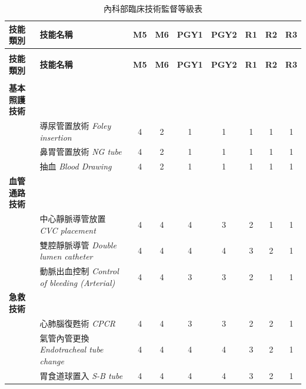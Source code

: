 \documentclass[a4paper,12pt]{article}
\begin{document}
\begin{longtable}{>{\raggedright}p{3cm}>{\raggedright\arraybackslash}p{4.5cm}ccccccc}
\caption{內科部臨床技術監督等級表} \label{tab:internal-medicine-skills} \\
\toprule
\textbf{技能類別} & \textbf{技能名稱} & \textbf{M5} & \textbf{M6} & \textbf{PGY1} & \textbf{PGY2} & \textbf{R1} & \textbf{R2} & \textbf{R3} \\
\midrule
\endfirsthead

\multicolumn{9}{c}{\textit{續前頁}} \\
\toprule
\textbf{技能類別} & \textbf{技能名稱} & \textbf{M5} & \textbf{M6} & \textbf{PGY1} & \textbf{PGY2} & \textbf{R1} & \textbf{R2} & \textbf{R3} \\
\midrule
\endhead

\midrule
\multicolumn{9}{r}{\textit{續下頁}} \\
\endfoot

\bottomrule
\endlastfoot

\textbf{基本照護技術} & & & & & & & & \\
\midrule
& 導尿管置放術 \newline \textit{Foley insertion} & 4 & 2 & 1 & 1 & 1 & 1 & 1 \\
& 鼻胃管置放術 \newline \textit{NG tube} & 4 & 2 & 1 & 1 & 1 & 1 & 1 \\
& 抽血 \newline \textit{Blood Drawing} & 4 & 2 & 1 & 1 & 1 & 1 & 1 \\
\midrule

\textbf{血管通路技術} & & & & & & & & \\
\midrule
& 中心靜脈導管放置 \newline \textit{CVC placement} & 4 & 4 & 4 & 3 & 2 & 1 & 1 \\
& 雙腔靜脈導管 \newline \textit{Double lumen catheter} & 4 & 4 & 4 & 4 & 3 & 2 & 1 \\
& 動脈出血控制 \newline \textit{Control of bleeding (Arterial)} & 4 & 4 & 3 & 3 & 2 & 1 & 1 \\
\midrule

\textbf{急救技術} & & & & & & & & \\
\midrule
& 心肺腦復甦術 \newline \textit{CPCR} & 4 & 4 & 3 & 3 & 2 & 2 & 1 \\
& 氣管內管更換 \newline \textit{Endotracheal tube change} & 4 & 4 & 4 & 4 & 3 & 2 & 1 \\
& 胃食道球置入 \newline \textit{S-B tube} & 4 & 4 & 4 & 4 & 3 & 2 & 1 \\
\midrule


\end{longtable}
\end{document}
